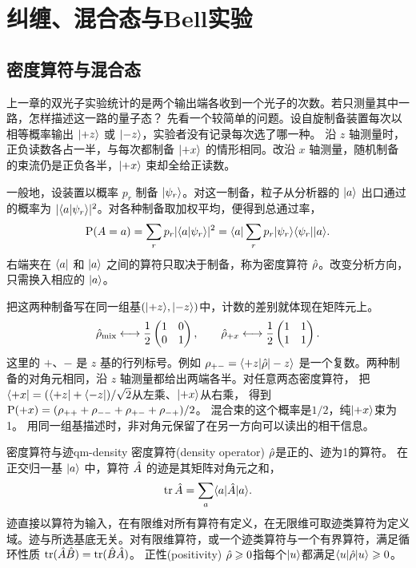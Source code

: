 \chapter{纠缠、混合态与Bell实验}
\label{ch:entanglement}

\section{密度算符与混合态}

上一章的双光子实验统计的是两个输出端各收到一个光子的次数。若只测量其中一路，怎样描述这一路的量子态？
先看一个较简单的问题。设自旋制备装置每次以相等概率输出 $\ket{+z}$ 或 $\ket{-z}$，实验者没有记录每次选了哪一种。
沿 $z$ 轴测量时，正负读数各占一半，与每次都制备 $\ket{+x}$ 的情形相同。改沿 $x$ 轴测量，随机制备的束流仍是正负各半，$\ket{+x}$ 束却全给正读数。

一般地，设装置以概率 $p_r$ 制备 $\ket{\psi_r}$。对这一制备，粒子从分析器的 $\ket a$ 出口通过的概率为 $\abs{\braket{a}{\psi_r}}^2$。对各种制备取加权平均，便得到总通过率，
\begin{equation}
    \P(A = a) = \sum_r p_r\abs{\braket{a}{\psi_r}}^2
        = \mel{a}{\sum_rp_r\ketbra{\psi_r}{\psi_r}}{a}.
\end{equation}
右端夹在 $\bra a$ 和 $\ket a$ 之间的算符只取决于制备，称为密度算符 $\op\rho$。改变分析方向，只需换入相应的 $\ket a$。

把这两种制备写在同一组基$(\ket{+z},\ket{-z})$中，计数的差别就体现在矩阵元上。
\begin{equation}
    \op{\rho}_{\mixed} \longleftrightarrow \frac12\begin{pmatrix}1&0\\0&1\end{pmatrix},
    \qquad
    \op{\rho}_{+x} \longleftrightarrow \frac12\begin{pmatrix}1&1\\1&1\end{pmatrix}.
\end{equation}
这里的 $+$、$-$ 是 $z$ 基的行列标号。例如 $\rho_{+-} = \mel{+z}{\op{\rho}}{-z}$ 是一个复数。两种制备的对角元相同，沿 $z$ 轴测量都给出两端各半。对任意两态密度算符，
把$\bra{+x} = (\bra{+z} + \bra{-z})/\sqrt2$从左乘、$\ket{+x}$从右乘，
得到 $\P(+x) = (\rho_{++} + \rho_{--} + \rho_{+-} + \rho_{-+})/2$。
混合束的这个概率是$1/2$，纯$\ket{+x}$束为1。
用同一组基描述时，非对角元保留了在另一方向可以读出的相干信息。

\begin{definition}{密度算符与迹}{qm-density}
    密度算符(density operator) $\op{\rho}$是正的、迹为1的算符。
    在正交归一基 $\ket{a}$ 中，算符 $\op{A}$ 的迹是其矩阵对角元之和，
    \begin{equation}
        \tr \op{A} = \sum_a\mel{a}{\op{A}}{a}.
    \end{equation}
    迹直接以算符为输入，在有限维对所有算符有定义，在无限维可取迹类算符为定义域。迹与所选基底无关。对有限维算符，或一个迹类算符与一个有界算符，满足循环性质 $\tr(\op{A}\op{B}) = \tr(\op{B}\op{A})$。
    正性(positivity) $\op{\rho} \geq 0$指每个$\ket{u}$都满足$\mel{u}{\op{\rho}}{u} \geq 0$。
\end{definition}

